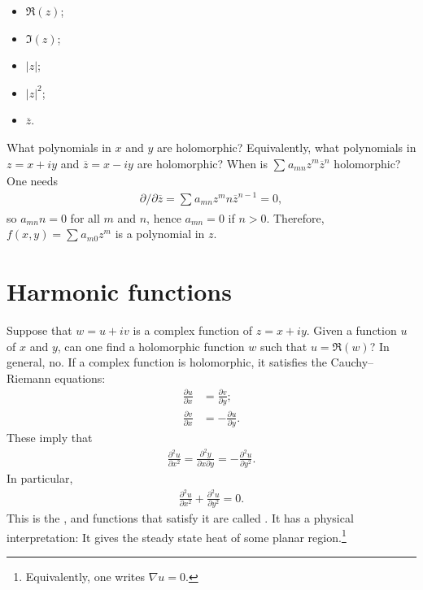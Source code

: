\documentclass[11pt, oneside,margin=1in]{article}
\begin{document}
\begin{example}\label{}\text{}
\begin{itemize}
	\item $\Re (z)$;
	\item $\Im (z)$;
	\item $\left\lvert z \right\rvert$;
	\item $\left\lvert z \right\rvert ^2$;
	\item $\overline{z}$.
\end{itemize}
\end{example}

What polynomials in $x$ and $y$ are holomorphic? Equivalently, what polynomials in $z=x+iy$ and $\overline{z}=x-iy$ are holomorphic? When is $\sum_{}^{} a_{mn}z^m \overline{z}^n$ holomorphic? 
One needs
\begin{align*}
	\partial/\partial \overline{z}= \sum_{}^{} a_{mn} z^m n \overline{z}^{n-1} = 0,
\end{align*}
so $a_{mn} n = 0$ for all $m$ and $n$, hence $a_{mn} = 0$ if $n>0$. Therefore, $f(x,y)=  \sum_{}^{} a_{m0}z^m$ is a polynomial in $z$.

\section{Harmonic functions}
Suppose that $w=u+iv$ is a complex function of $ z=x+iy$. Given a function $u$ of $x$ and $y$, can one find a holomorphic function $w$ such that $u = \Re(w)$? In general, no. If a complex function is holomorphic, it satisfies the Cauchy--Riemann equations:
\begin{align*}
	\frac{\partial u}{\partial x} &= \frac{\partial v}{\partial y};\\\frac{\partial v}{\partial x}& = - \frac{\partial u}{\partial y}.
\end{align*}
These imply that
\begin{align*}
	\frac{\partial^2 u}{\partial x^2} = \frac{\partial^2y}{\partial x \partial y} = -\frac{\partial^2 u}{\partial y^2}.
\end{align*}
In particular,
\begin{align*}
\frac{\partial ^2 u}{\partial x^2} + \frac{\partial^2 u}{\partial y^2} = 0.
\end{align*}
This is the , and functions that satisfy it are called . It has a physical interpretation: It gives the steady state heat of some planar region.\footnote{Equivalently, one writes $\nabla u=0$.} 
\end{document}
